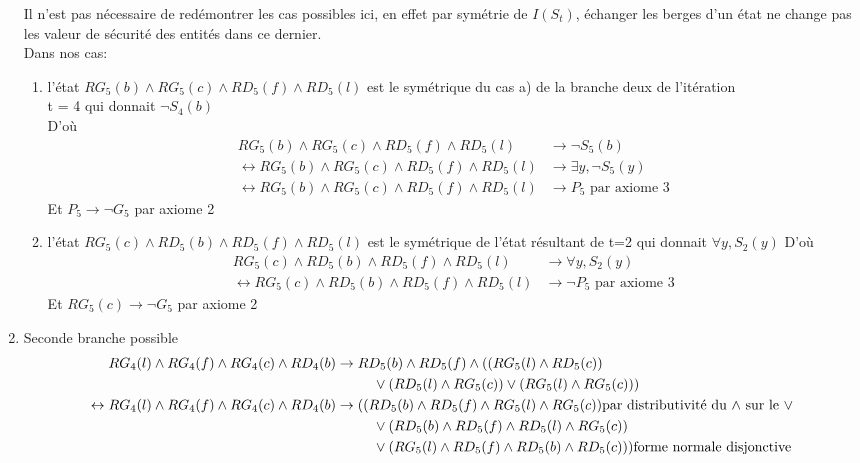 \documentclass{article}
\begin{document}
\begin{enumerate}
Il n'est pas nécessaire de redémontrer les cas possibles ici, en effet par symétrie de $I(S_t)$, échanger les berges d'un état ne change pas les valeur de sécurité des entités dans ce dernier.\\
Dans nos cas:
\begin{enumerate}
  \item  l'état $RG_5(b) \wedge RG_5(c) \wedge RD_5(f) \wedge RD_5(l)$ est le symétrique du cas a) de la branche deux de l'itération\\t = 4 qui donnait $\neg S_4(b)$\\
   D'où
  \begin{align*}
    RG_5(b) \wedge RG_5(c) \wedge RD_5(f) \wedge RD_5(l) &\to \neg S_5(b)\\
    \leftrightarrow RG_5(b) \wedge RG_5(c) \wedge RD_5(f) \wedge RD_5(l) &\to \exists y, \neg S_5(y)\\
    \leftrightarrow RG_5(b) \wedge RG_5(c) \wedge RD_5(f) \wedge RD_5(l) &\to P_5 \text{ par axiome 3}
  \end{align*}
  Et $P_5 \to \neg G_5$ par axiome 2
  \item  l'état $RG_5(c) \wedge RD_5(b) \wedge RD_5(f) \wedge RD_5(l)$ est le symétrique de l'état résultant de t=2 qui donnait $\forall y, S_2(y)$
   D'où
  \begin{align*}
    RG_5(c) \wedge RD_5(b) \wedge RD_5(f) \wedge RD_5(l) &\to \forall y, S_2(y)\\
    \leftrightarrow RG_5(c) \wedge RD_5(b) \wedge RD_5(f) \wedge RD_5(l) &\to \neg P_5 \text{ par axiome 3}
  \end{align*}
  Et $RG_5(c) \to \neg G_5$ par axiome 2
\end{enumerate}

\item Seconde branche possible
  \begin{align*}
        RG_4(l) \wedge RG_4(f) \wedge RG_4(c) \wedge RD_4(b)&\to RD_5(b) \wedge RD_5(f) \wedge ((RG_5(l)\wedge RD_5(c))\\
        & \hphantom{aaaaa} \vee (RD_5(l)\wedge RG_5(c)) \vee(RG_5(l)\wedge RG_5(c)))\\
        \leftrightarrow RG_4(l) \wedge RG_4(f) \wedge RG_4(c) \wedge RD_4(b) &\to (( RD_5(b) \wedge RD_5(f) \wedge RG_5(l) \wedge RG_5(c))\text{par distributivité du $\wedge$ sur le $\vee$}\\
        & \hphantom{aaaaa} \vee (RD_5(b) \wedge RD_5(f) \wedge RD_5(l) \wedge RG_5(c))\\
        & \hphantom{aaaaa} \vee (RG_5(l) \wedge RD_5(f) \wedge RD_5(b) \wedge RD_5(c)))\text{forme normale disjonctive}\\
  \end{align*}



\end{enumerate}
\end{document}
